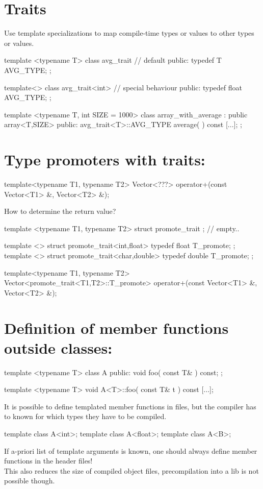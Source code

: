 \section{Traits} Use template specializations to map compile-time types or values to
other types or values.
\begin{myverbatim}
template <typename T> class avg_trait {  // default
public:
  typedef T AVG_TYPE;
};

template<> class avg_trait<int> {  // special behaviour
public:
  typedef float AVG_TYPE;
};

template <typename T, int SIZE = 1000>
class array_with_average : public array<T,SIZE> {
public:
  avg_trait<T>::AVG_TYPE average( ) const { [...]; }
};
\end{myverbatim}


\section{Type promoters with traits:}
\begin{myverbatim}
template<typename T1, typename T2>
Vector<???> operator+(const Vector<T1> &, Vector<T2> &);
\end{myverbatim}
How to determine the return value?
\begin{myverbatim}
template <typename T1, typename T2>
struct promote_trait { };  // empty..

template <> struct promote_trait<int,float> {
  typedef float T_promote;
};
template <> struct promote_trait<char,double> {
  typedef double T_promote;
};

template<typename T1, typename T2>
Vector<promote_trait<T1,T2>::T_promote>
operator+(const Vector<T1> &, Vector<T2> &);
\end{myverbatim}


\section{Definition of member functions outside classes:}
\begin{myverbatim}
template <typename T>
class A {
public:
  void foo( const T& ) const;
};

template <typename T>
void A<T>::foo( const T& t ) const {
  [...];
}
\end{myverbatim}
It is possible to define templated member functions in  files,
but the compiler has to known for which types they have to be compiled.
\begin{myverbatim}
template class A<int>;
template class A<float>;
template class A<B>;
\end{myverbatim}
If a-priori list of template arguments is known, one should always define
member functions in the header files! \\
This also reduces the size of compiled object files, precompilation into a lib
is not possible though.



